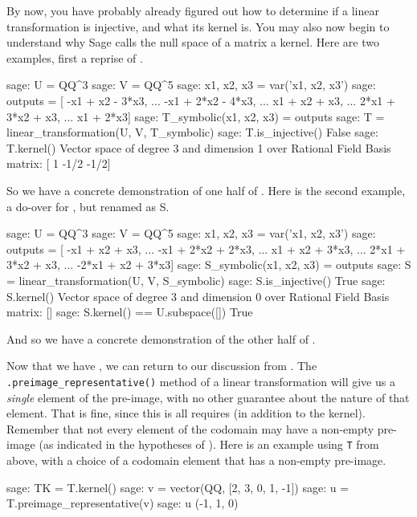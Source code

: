 By now, you have probably already figured out how to determine if a linear transformation is injective, and what its kernel is.  You may also now begin to understand why Sage calls the null space of a matrix a kernel.  Here are two examples, first a reprise of .
%
\begin{sageexample}
sage: U = QQ^3
sage: V = QQ^5
sage: x1, x2, x3 = var('x1, x2, x3')
sage: outputs = [ -x1 +   x2 - 3*x3,
...               -x1 + 2*x2 - 4*x3,
...                x1 +   x2 +   x3,
...              2*x1 + 3*x2 +   x3,
...                x1        + 2*x3]
sage: T_symbolic(x1, x2, x3) = outputs
sage: T = linear_transformation(U, V, T_symbolic)
sage: T.is_injective()
False
sage: T.kernel()
Vector space of degree 3 and dimension 1 over Rational Field
Basis matrix:
[   1 -1/2 -1/2]
\end{sageexample}
%
So we have a concrete demonstration of one half of .  Here is the second example, a do-over for , but renamed as S.
%
\begin{sageexample}
sage: U = QQ^3
sage: V = QQ^5
sage: x1, x2, x3 = var('x1, x2, x3')
sage: outputs = [  -x1 +   x2 +   x3,
...                -x1 + 2*x2 + 2*x3,
...                 x1 +   x2 + 3*x3,
...               2*x1 + 3*x2 +   x3,
...              -2*x1 +   x2 + 3*x3]
sage: S_symbolic(x1, x2, x3) = outputs
sage: S = linear_transformation(U, V, S_symbolic)
sage: S.is_injective()
True
sage: S.kernel()
Vector space of degree 3 and dimension 0 over Rational Field
Basis matrix:
[]
sage: S.kernel() == U.subspace([])
True
\end{sageexample}
%
And so we have a concrete demonstration of the other half of .\par
%
Now that we have , we can return to our discussion from .  The \verb?.preimage_representative()? method of a linear transformation will give us a \emph{single} element of the pre-image, with no other guarantee about the nature of that element.  That is fine, since this is all  requires (in addition to the kernel).  Remember that not every element of the codomain may have a non-empty pre-image (as indicated in the hypotheses of ).  Here is an example using \verb?T? from above, with a choice of a codomain element that has a non-empty pre-image.
%
\begin{sageexample}
sage: TK = T.kernel()
sage: v = vector(QQ, [2, 3, 0, 1, -1])
sage: u = T.preimage_representative(v)
sage: u
(-1, 1, 0)
\end{sageexample}
